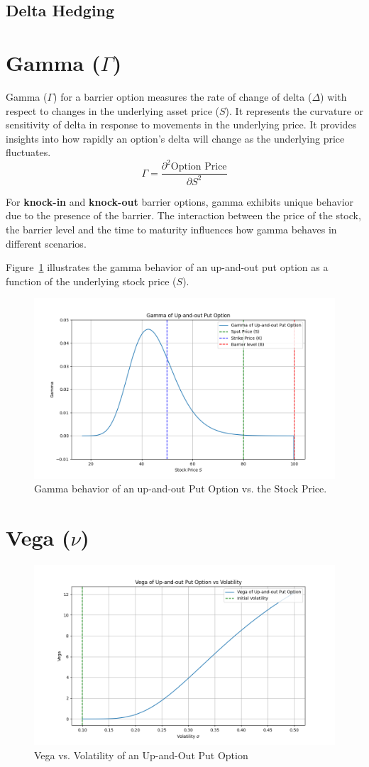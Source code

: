 \subsection{Delta Hedging}

\section{Gamma (\(\Gamma\))}

Gamma (\(\Gamma\)) for a barrier option measures the rate of change of delta (\(\Delta\)) with respect to changes in the underlying asset price (\(S\)). It represents the curvature or sensitivity of delta in response to movements in the underlying price. It provides insights into how rapidly an option's delta will change as the underlying price fluctuates.
\[
\Gamma = \frac{\partial^2 \text{Option Price}}{\partial S^2}
\]

For \textbf{knock-in} and \textbf{knock-out} barrier options, gamma exhibits unique behavior due to the presence of the barrier. The interaction between the price of the stock, the barrier level and the time to maturity influences how gamma behaves in different scenarios.

Figure~\ref{fig:gamma_behavior} illustrates the gamma behavior of an up-and-out put option as a function of the underlying stock price (\(S\)). 

\begin{figure}[h]
    \centering
    \includegraphics[width=.65\linewidth]{content/images/gamma-upout.png}
    \caption{Gamma behavior of an up-and-out Put Option vs. the Stock Price.}
    \label{fig:gamma_behavior}
\end{figure}

\section{Vega (\(\nu\))}

\begin{figure}[h]
    \centering
    \includegraphics[width=.65\linewidth]{content/images/vega_upout.png}
    \caption{Vega vs. Volatility of an Up-and-Out Put Option}
    \label{fig:vega_behavior}
\end{figure}


